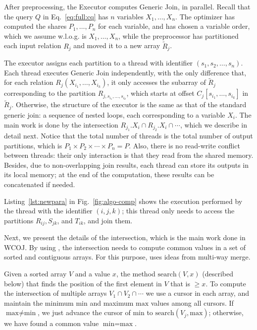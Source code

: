 After preprocessing, the Executor computes Generic Join, in parallel.
Recall that the query $Q$ in Eq.~\eqref{eq:full:cq} has $n$ variables
$X_1, \ldots, X_n$.  The optimizer has computed the shares
$P_1, \ldots, P_n$ for each variable, and has chosen a variable order,
which we assume w.l.o.g. is $X_1, \ldots, X_n$, while the preprocessor
has partitioned each input relation $R_j$ and moved it to a new array
$\tilde R_j$.

The executor assigns each partition to a thread with identifier
$(s_1, s_2, \ldots, s_n)$.  Each thread executes Generic Join
independently, with the only difference that, for each relation
$R_j(X_{i_1}, \ldots, X_{i_k})$, it only accesses the subarray of
$\tilde R_j$ corresponding to the partition
$R_{j,s_{i_1}, \ldots, s_{i_k}}$, which starts at offset
$C_j[s_{i_1}, \ldots, s_{i_k}]$ in $\tilde R_j$.  Otherwise, the
structure of the executor is the same as that of the standard generic
join: a sequence of nested loops, each corresponding to a variable
$X_i$.  The main work is done by the intersection
$R_{j_1}.X_i \cap R_{j_2}.X_i\cap \cdots$, which we describe in detail
next.  Notice that the total number of threads is the total number of
output partitions, which is $P_1 \times P_2 \times \cdots \times P_n= P$.  Also,
there is no read-write conflict between threads: their only
interaction is that they read from the shared memory.  Besides, due to
non-overlapping join results, each thread can store its outputs in its
local memory; at the end of the computation, these results can be
concatenated if needed.

Listing~\ref{lst:newpara} in Fig.~\ref{fig:algo-comp} shows the execution performed by the
thread with the identifier $(i,j,k)$; this thread only needs to access the
partitions $R_{ij}, S_{jk}$, and $T_{ik}$, and join them.

Next, we present the details of the intersection, which is the main
work done in WCOJ. By using \indexlayout, the intersection needs to compute common values in a set of sorted and contiguous
arrays.  For this purpose, \name uses ideas from multi-way merge.

Given a sorted array $V$ and a value $x$, the method
$\text{search}(V, x)$ (described below) that finds the position of the
first element in $V$ that is $\geq x$.  To compute the intersection of
multiple arrays $V_1 \cap V_2 \cap \cdots$ we use a cursor in each
array, and maintain the minimum $\text{min}$ and maximum $\text{max}$
values among all cursors.  If $\text{max} \neq \text{min}$, we just
advance the cursor of $\text{min}$ to
$\text{search}(V_j, \text{max})$; otherwise, we have found a common 
value $\text{min}=\text{max}$.

